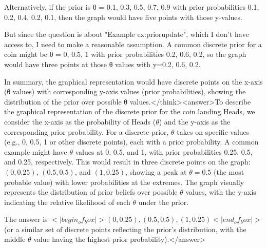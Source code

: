 Alternatively, if the prior is θ = 0.1, 0.3, 0.5, 0.7, 0.9 with prior probabilities 0.1, 0.2, 0.4, 0.2, 0.1, then the graph would have five points with those y-values.

But since the question is about "Example ex:priorupdate", which I don't have access to, I need to make a reasonable assumption. A common discrete prior for a coin might be θ = 0, 0.5, 1 with prior probabilities 0.2, 0.6, 0.2, so the graph would have three points at those θ values with y=0.2, 0.6, 0.2.

In summary, the graphical representation would have discrete points on the x-axis (θ values) with corresponding y-axis values (prior probabilities), showing the distribution of the prior over possible θ values.</think><answer>To describe the graphical representation of the discrete prior for the coin landing Heads, we consider the x-axis as the probability of Heads (\(\theta\)) and the y-axis as the corresponding prior probability. For a discrete prior, \(\theta\) takes on specific values (e.g., 0, 0.5, 1 or other discrete points), each with a prior probability. A common example might have \(\theta\) values at 0, 0.5, and 1, with prior probabilities 0.25, 0.5, and 0.25, respectively. This would result in three discrete points on the graph: \((0, 0.25)\), \((0.5, 0.5)\), and \((1, 0.25)\), showing a peak at \(\theta = 0.5\) (the most probable value) with lower probabilities at the extremes. The graph visually represents the distribution of prior beliefs over possible \(\theta\) values, with the y-axis indicating the relative likelihood of each \(\theta\) under the prior.  

The answer is \(<|begin_of_box|>(0, 0.25), (0.5, 0.5), (1, 0.25)<|end_of_box|>\) (or a similar set of discrete points reflecting the prior's distribution, with the middle \(\theta\) value having the highest prior probability).</answer>